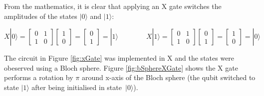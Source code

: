 From the mathematics, it is clear that applying an X gate switches the amplitudes of the states $|0\rangle$ and $|1\rangle$:

$$ X|0\rangle = \begin{bmatrix} 0 & 1 \\ 1 & 0 \end{bmatrix}\begin{bmatrix} 1 \\ 0 \end{bmatrix} = \begin{bmatrix} 0 \\ 1 \end{bmatrix} = |1\rangle \quad\quad\quad\quad
X|1\rangle = \begin{bmatrix} 0 & 1 \\ 1 & 0 \end{bmatrix}\begin{bmatrix} 0 \\ 1 \end{bmatrix} = \begin{bmatrix} 1 \\ 0 \end{bmatrix} = |0\rangle$$

The circuit in Figure \ref{fig:xGate} was implemented in X and the states were obeserved using a Bloch sphere. Figure \ref{fig:bSphereXGate} shows the X gate performs a rotation by $\pi$ around x-axis of the Bloch sphere (the qubit switched to state $|1\rangle$ after being initialised in state~$|0\rangle$).


